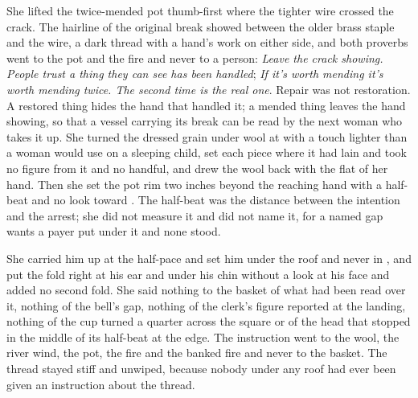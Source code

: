 She lifted the twice-mended pot thumb-first where the tighter wire crossed the crack. The hairline of the original break showed between the older brass staple and the wire, a dark thread with a hand's work on either side, and both proverbs went to the pot and the fire and never to a person: \emph{Leave the crack showing. People trust a thing they can see has been handled}; \emph{If it's worth mending it's worth mending twice. The second time is the real one}. Repair was not restoration. A restored thing hides the hand that handled it; a mended thing leaves the hand showing, so that a vessel carrying its break can be read by the next woman who takes it up. She turned the dressed grain under wool at  with a touch lighter than a woman would use on a sleeping child, set each piece where it had lain and took no figure from it and no handful, and drew the wool back with the flat of her hand. Then she set the pot rim two inches beyond the reaching hand with a half-beat and no look toward . The half-beat was the distance between the intention and the arrest; she did not measure it and did not name it, for a named gap wants a payer put under it and none stood.

She carried him up  at the half-pace and set him under the roof and never in , and put the fold right at his ear and under his chin without a look at his face and added no second fold. She said nothing to the basket of what had been read over it, nothing of the bell's gap, nothing of the clerk's figure reported at the landing, nothing of the cup turned a quarter across the square or of the head that stopped in the middle of its half-beat at the edge. The instruction went to the wool, the river wind, the pot, the fire and the banked fire and never to the basket. The thread stayed stiff and unwiped, because nobody under any roof had ever been given an instruction about the thread.


